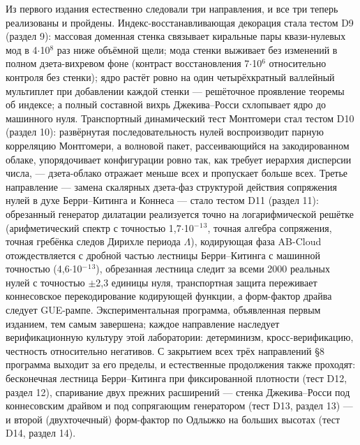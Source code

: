 \documentclass[11pt,a4paper]{article}
\begin{document}
Из первого издания естественно следовали три направления, и все три теперь реализованы и пройдены. Индекс-восстанавливающая декорация стала тестом D9 (раздел 9): массовая доменная стенка связывает киральные пары квази-нулевых мод в 4$\cdot$10$^{8}$ раз ниже объёмной щели; мода стенки выживает без изменений в полном дзета-вихревом фоне (контраст восстановления 7$\cdot$10$^{6}$ относительно контроля без стенки); ядро растёт ровно на один четырёхкратный валлейный мультиплет при добавлении каждой стенки --- решёточное проявление теоремы об индексе; а полный составной вихрь Джекива--Росси схлопывает ядро до машинного нуля. Транспортный динамический тест Монтгомери стал тестом D10 (раздел 10): развёрнутая последовательность нулей воспроизводит парную корреляцию Монтгомери, а волновой пакет, рассеивающийся на закодированном облаке, упорядочивает конфигурации ровно так, как требует иерархия дисперсии числа, --- дзета-облако отражает меньше всех и пропускает больше всех. Третье направление --- замена скалярных дзета-фаз структурой действия сопряжения нулей в духе Берри--Китинга и Коннеса --- стало тестом D11 (раздел 11): обрезанный генератор дилатации реализуется точно на логарифмической решётке (арифметический спектр с точностью 1,7$\cdot$10$^{-}$$^{1}$$^{3}$, точная алгебра сопряжения, точная гребёнка следов Дирихле периода $\Lambda$), кодирующая фаза AB-Cloud отождествляется с дробной частью лестницы Берри--Китинга с машинной точностью (4,6$\cdot$10$^{-}$$^{1}$$^{3}$), обрезанная лестница следит за всеми 2000 реальных нулей с точностью $\pm$2,3 единицы нуля, транспортная защита переживает коннесовское перекодирование кодирующей функции, а форм-фактор драйва следует GUE-рампе. Экспериментальная программа, объявленная первым изданием, тем самым завершена; каждое направление наследует верификационную культуру этой лаборатории: детерминизм, кросс-верификацию, честность относительно негативов. С закрытием всех трёх направлений \S{}8 программа выходит за его пределы, и естественные продолжения также проходят: бесконечная лестница Берри--Китинга при фиксированной плотности (тест D12, раздел 12), спаривание двух прежних расширений --- стенка Джекива--Росси под коннесовским драйвом и под сопрягающим генератором (тест D13, раздел 13) --- и второй (двухточечный) форм-фактор по Одлыжко на больших высотах (тест D14, раздел 14).
\end{document}
